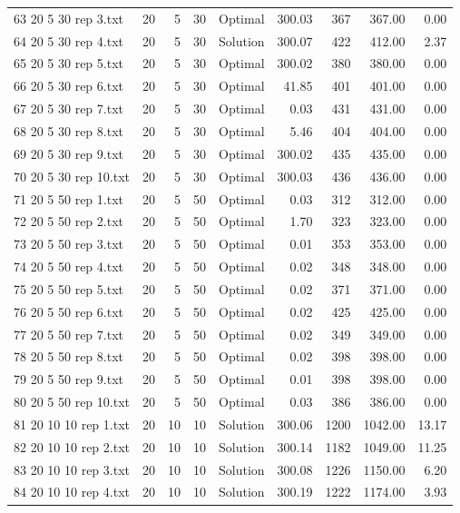\begin{longtable}{lrrllrrrr}
63 20 5 30 rep 3.txt & 20 & 5 & 30 & Optimal & 300.03 & 367 & 367.00 &  0.00\\
64 20 5 30 rep 4.txt & 20 & 5 & 30 & Solution & 300.07 & 422 & 412.00 &  2.37\\
65 20 5 30 rep 5.txt & 20 & 5 & 30 & Optimal & 300.02 & 380 & 380.00 &  0.00\\
66 20 5 30 rep 6.txt & 20 & 5 & 30 & Optimal & 41.85 & 401 & 401.00 &  0.00\\
67 20 5 30 rep 7.txt & 20 & 5 & 30 & Optimal &  0.03 & 431 & 431.00 &  0.00\\
68 20 5 30 rep 8.txt & 20 & 5 & 30 & Optimal &  5.46 & 404 & 404.00 &  0.00\\
69 20 5 30 rep 9.txt & 20 & 5 & 30 & Optimal & 300.02 & 435 & 435.00 &  0.00\\
70 20 5 30 rep 10.txt & 20 & 5 & 30 & Optimal & 300.03 & 436 & 436.00 &  0.00\\
71 20 5 50 rep 1.txt & 20 & 5 & 50 & Optimal &  0.03 & 312 & 312.00 &  0.00\\
72 20 5 50 rep 2.txt & 20 & 5 & 50 & Optimal &  1.70 & 323 & 323.00 &  0.00\\
73 20 5 50 rep 3.txt & 20 & 5 & 50 & Optimal &  0.01 & 353 & 353.00 &  0.00\\
74 20 5 50 rep 4.txt & 20 & 5 & 50 & Optimal &  0.02 & 348 & 348.00 &  0.00\\
75 20 5 50 rep 5.txt & 20 & 5 & 50 & Optimal &  0.02 & 371 & 371.00 &  0.00\\
76 20 5 50 rep 6.txt & 20 & 5 & 50 & Optimal &  0.02 & 425 & 425.00 &  0.00\\
77 20 5 50 rep 7.txt & 20 & 5 & 50 & Optimal &  0.02 & 349 & 349.00 &  0.00\\
78 20 5 50 rep 8.txt & 20 & 5 & 50 & Optimal &  0.02 & 398 & 398.00 &  0.00\\
79 20 5 50 rep 9.txt & 20 & 5 & 50 & Optimal &  0.01 & 398 & 398.00 &  0.00\\
80 20 5 50 rep 10.txt & 20 & 5 & 50 & Optimal &  0.03 & 386 & 386.00 &  0.00\\
81 20 10 10 rep 1.txt & 20 & 10 & 10 & Solution & 300.06 & 1200 & 1042.00 & 13.17\\
82 20 10 10 rep 2.txt & 20 & 10 & 10 & Solution & 300.14 & 1182 & 1049.00 & 11.25\\
83 20 10 10 rep 3.txt & 20 & 10 & 10 & Solution & 300.08 & 1226 & 1150.00 &  6.20\\
84 20 10 10 rep 4.txt & 20 & 10 & 10 & Solution & 300.19 & 1222 & 1174.00 &  3.93\\

\end{longtable}
